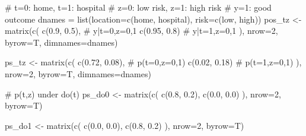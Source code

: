 \documentclass[
  letterpaper,
  DIV=11,
  numbers=noendperiod]{scrartcl}
\newenvironment{Shaded}{\begin{snugshade}}{\end{snugshade}}
\newcommand{\AttributeTok}[1]{\textcolor[rgb]{0.40,0.45,0.13}{#1}}
\newcommand{\CommentTok}[1]{\textcolor[rgb]{0.37,0.37,0.37}{#1}}
\newcommand{\DecValTok}[1]{\textcolor[rgb]{0.68,0.00,0.00}{#1}}
\newcommand{\FloatTok}[1]{\textcolor[rgb]{0.68,0.00,0.00}{#1}}
\newcommand{\FunctionTok}[1]{\textcolor[rgb]{0.28,0.35,0.67}{#1}}
\newcommand{\NormalTok}[1]{\textcolor[rgb]{0.00,0.23,0.31}{#1}}
\newcommand{\OtherTok}[1]{\textcolor[rgb]{0.00,0.23,0.31}{#1}}
\newcommand{\StringTok}[1]{\textcolor[rgb]{0.13,0.47,0.30}{#1}}
\begin{document}
\begin{Shaded}
\begin{Highlighting}[]
\CommentTok{\# t=0: home, t=1: hospital}
\CommentTok{\# z=0: low risk, z=1: high risk}
\CommentTok{\# y=1: good outcome}
\NormalTok{dnames }\OtherTok{=} \FunctionTok{list}\NormalTok{(}\AttributeTok{location=}\FunctionTok{c}\NormalTok{(}\StringTok{\textquotesingle{}home\textquotesingle{}}\NormalTok{, }\StringTok{\textquotesingle{}hospital\textquotesingle{}}\NormalTok{), }\AttributeTok{risk=}\FunctionTok{c}\NormalTok{(}\StringTok{\textquotesingle{}low\textquotesingle{}}\NormalTok{, }\StringTok{\textquotesingle{}high\textquotesingle{}}\NormalTok{))}
\NormalTok{pos\_tz }\OtherTok{\textless{}{-}} \FunctionTok{matrix}\NormalTok{(}\FunctionTok{c}\NormalTok{(}
  \FunctionTok{c}\NormalTok{(}\FloatTok{0.9}\NormalTok{,  }\FloatTok{0.5}\NormalTok{), }\CommentTok{\# y|t=0,z=0,1}
  \FunctionTok{c}\NormalTok{(}\FloatTok{0.95}\NormalTok{, }\FloatTok{0.8}\NormalTok{)  }\CommentTok{\# y|t=1,z=0,1}
\NormalTok{), }\AttributeTok{nrow=}\DecValTok{2}\NormalTok{, }\AttributeTok{byrow=}\NormalTok{T,}
\AttributeTok{dimnames=}\NormalTok{dnames)}

\NormalTok{ps\_tz }\OtherTok{\textless{}{-}} \FunctionTok{matrix}\NormalTok{(}\FunctionTok{c}\NormalTok{(}
  \FunctionTok{c}\NormalTok{(}\FloatTok{0.72}\NormalTok{, }\FloatTok{0.08}\NormalTok{), }\CommentTok{\# p(t=0,z=0,1)}
  \FunctionTok{c}\NormalTok{(}\FloatTok{0.02}\NormalTok{, }\FloatTok{0.18}\NormalTok{)  }\CommentTok{\# p(t=1,z=0,1)}
\NormalTok{), }\AttributeTok{nrow=}\DecValTok{2}\NormalTok{, }\AttributeTok{byrow=}\NormalTok{T, }\AttributeTok{dimnames=}\NormalTok{dnames)}

\CommentTok{\# p(t,z) under do(t)}
\NormalTok{ps\_do0 }\OtherTok{\textless{}{-}} \FunctionTok{matrix}\NormalTok{(}\FunctionTok{c}\NormalTok{( }
  \FunctionTok{c}\NormalTok{(}\FloatTok{0.8}\NormalTok{, }\FloatTok{0.2}\NormalTok{), }
  \FunctionTok{c}\NormalTok{(}\FloatTok{0.0}\NormalTok{, }\FloatTok{0.0}\NormalTok{)  }
\NormalTok{), }\AttributeTok{nrow=}\DecValTok{2}\NormalTok{, }\AttributeTok{byrow=}\NormalTok{T)}

\NormalTok{ps\_do1 }\OtherTok{\textless{}{-}} \FunctionTok{matrix}\NormalTok{(}\FunctionTok{c}\NormalTok{( }
  \FunctionTok{c}\NormalTok{(}\FloatTok{0.0}\NormalTok{, }\FloatTok{0.0}\NormalTok{), }
  \FunctionTok{c}\NormalTok{(}\FloatTok{0.8}\NormalTok{, }\FloatTok{0.2}\NormalTok{) }
\NormalTok{), }\AttributeTok{nrow=}\DecValTok{2}\NormalTok{, }\AttributeTok{byrow=}\NormalTok{T)}



\end{Highlighting}
\end{Shaded}
\end{document}

